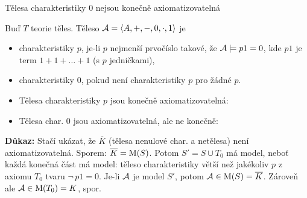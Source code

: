 \documentclass{beamer}
\begin{document}
\begin{frame}{Tělesa charakteristiky 0 nejsou konečně axiomatizovatelná}

    \pause
    Buď $T$ teorie těles. Těleso $\mathcal{A}=\langle A,+,-,0,\cdot,1 \rangle$ je\pause
    \vspace{-6pt}
    \begin{itemize}
        \item \alert{charakteristiky $p$}, je-li $p$ nejmenší prvočíslo takové, že $\mathcal{A}\models p1=0$, kde $p1$ je term $1+1+\dots+1$ (s $p$ jedničkami),\pause
        \item \alert{charakteristiky 0}, pokud není charakteristiky $p$ pro žádné $p$.\pause
        \item Tělesa charakteristiky $p$ jsou konečně axiomatizovatelná: 
        \pause
        \item Tělesa char. 0 jsou axiomatizovatelná, ale ne konečně: 
        \pause
    \end{itemize}
    
    \pause
    \textbf{Důkaz:} \pause
    Stačí ukázat, že $\overline{K}$ (tělesa nenulové char. a netělesa) není axiomatizovatelná. 
    \pause \alert{Sporem: $\overline{K}=\operatorname{M}(S)$.} 
    \pause Potom $S'=S\cup T_0$ má model, neboť každá konečná část má model: těleso charakteristiky větší než jakékoliv $p$ z axiomu $T_0$ tvaru $\neg\, p1=0$. 
    \pause Je-li $\mathcal{A}$ je model $S'$, potom $\mathcal{A}\in\operatorname{M}(S)=\overline{K}$. Zároveň ale $\mathcal{A}\in\operatorname{M}(T_0)=K$, spor.\hfill\qedsymbol

\end{frame}
\end{document}
